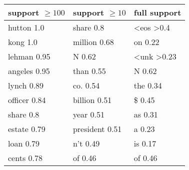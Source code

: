 \begin{tabular}{lll}
    \toprule
    \textbf{support} $\ge 100$ &\textbf{support} $\ge 10$ & \textbf{full support}  \\
    \midrule
    hutton 1.0 & share 0.8& \textless eos \textgreater 0.4\\
    kong 1.0 &million 0.68& on 0.22\\
    lehman 0.95 & N 0.62& \textless unk \textgreater 0.23\\
    angeles 0.95 & than 0.55 & N 0.62 \\
    lynch 0.89 & co. 0.54 & the 0.34 \\
    officer 0.84 & billion 0.51 & \$ 0.45 \\
    share 0.8 & year 0.51 & as 0.31 \\
    estate 0.79 & president 0.51 & a 0.23 \\
    loan 0.79 & n't 0.49 &  is 0.17\\
    cents 0.78& of 0.46  & of 0.46 \\
    \bottomrule
\end{tabular}


